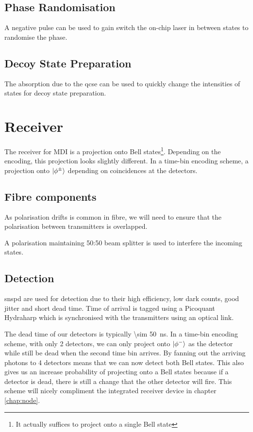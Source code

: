 \subsection{Phase Randomisation}

A negative pulse can be used to gain switch the on-chip laser in between states to randomise the phase. 

\subsection{Decoy State Preparation}

The absorption due to the \ac{qcse} can be used to quickly change the intensities of states for decoy state preparation.

\section{Receiver}

The receiver for \ac{MDI} is a projection onto Bell states\footnote{It actually suffices to project onto a single Bell state}. Depending on the encoding, this projection looks slightly different. In a time-bin encoding scheme, a projection onto $\ket{\phi^\pm}$ depending on coincidences at the detectors.

\subsection{Fibre components}

As polarisation drifts is common in fibre, we will need to ensure that the polarisation between transmitters is overlapped. 

A polarisation maintaining 50:50 beam splitter is used to interfere the incoming states.

\subsection{Detection}

\Acs{snspd} are used for detection due to their high efficiency, low dark counts, good jitter and short dead time. Time of arrival is tagged using a Picoquant Hydraharp which is synchronised with the transmitters using an optical link.

The dead time of our detectors is typically \SI{\sim 50}{ns}. In a time-bin encoding scheme, with only 2 detectors, we can only project onto $\ket{\phi^{-}}$ as the detector while still be dead when the second time bin arrives. By fanning out the arriving photons to 4 detectors means that we can now detect both Bell states. This also gives us an increase probability of projecting onto a Bell states because if a detector is dead, there is still a change that the other detector will fire. This scheme will nicely compliment the integrated receiver device in chapter \ref{chap:node}.

